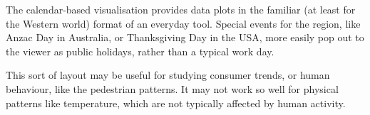 \documentclass[article]{jss}
\begin{document}
\label{sec:discussion}

The calendar-based visualisation provides data plots in the familiar (at
least for the Western world) format of an everyday tool. Special events
for the region, like Anzac Day in Australia, or Thanksgiving Day in the
USA, more easily pop out to the viewer as public holidays, rather than a
typical work day.

This sort of layout may be useful for studying consumer trends, or human
behaviour, like the pedestrian patterns. It may not work so well for
physical patterns like temperature, which are not typically affected by
human activity.


\end{document}

